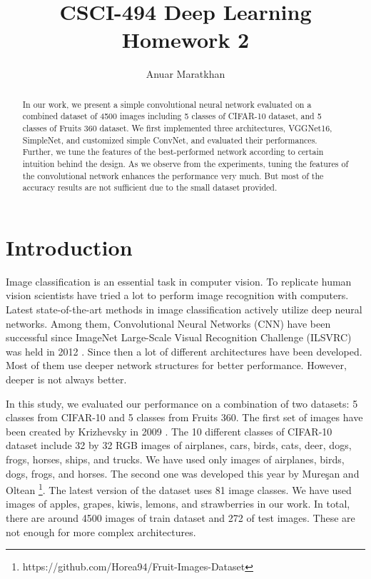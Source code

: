 \documentclass{IEEEtran}
\title{CSCI-494 Deep Learning Homework 2}
\author{Anuar Maratkhan}
\affil{School of Science and Technology\\Nazarbayev University\\anuar.maratkhan@nu.edu.kz}
\begin{document}
\maketitle

\begin{abstract}
	In our work, we present a simple convolutional neural network evaluated on a combined dataset of 4500 images including 5 classes of CIFAR-10 dataset, and 5 classes of Fruits 360 dataset. We first implemented three architectures, VGGNet16, SimpleNet, and customized simple ConvNet, and evaluated their performances. Further, we tune the features of the best-performed network according to certain intuition behind the design. As we observe from the experiments, tuning the features of the convolutional network enhances the performance very much. But most of the accuracy results are not sufficient due to the small dataset provided.
\end{abstract}

\section{Introduction}

Image classification is an essential task in computer vision. To replicate human vision scientists have tried a lot to perform image recognition with computers. Latest state-of-the-art methods in image classification actively utilize deep neural networks. Among them, Convolutional Neural Networks (CNN) have been successful since ImageNet Large-Scale Visual Recognition Challenge (ILSVRC) was held in 2012 \cite{Russakovsky2015}. Since then a lot of different architectures have been developed. Most of them use deeper network structures for better performance. However, deeper is not always better.

In this study, we evaluated our performance on a combination of two datasets: 5 classes from CIFAR-10 and 5 classes from Fruits 360. The first set of images have been created by Krizhevsky in 2009 \cite{Krizhevsky09learningmultiple}. The 10 different classes of CIFAR-10 dataset include 32 by 32 RGB images of airplanes, cars, birds, cats, deer, dogs, frogs, horses, ships, and trucks. We have used only images of airplanes, birds, dogs, frogs, and horses. The second one was developed this year by Mureşan and Oltean \cite{Fruits} \footnote{https://github.com/Horea94/Fruit-Images-Dataset}. The latest version of the dataset uses 81 image classes. We have used images of apples, grapes, kiwis, lemons, and strawberries in our work. In total, there are around 4500 images of train dataset and 272 of test images. These are not enough for more complex architectures.
\end{document}
